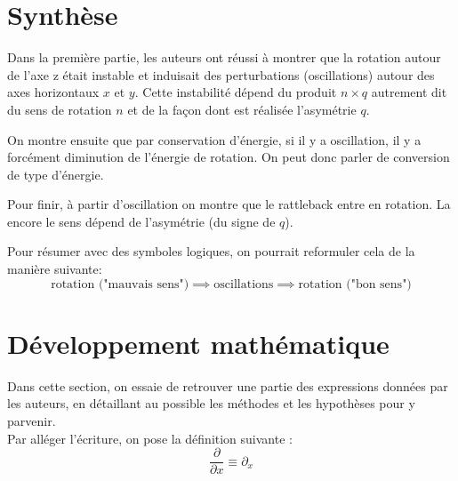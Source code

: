 \documentclass[12pt,a4paper]{article}
\begin{document}
	\section{Synthèse}
	Dans la première partie, les auteurs ont réussi à montrer que la rotation autour de l'axe z était instable et induisait des perturbations (oscillations) autour des axes horizontaux $x$ et $y$. Cette instabilité dépend du produit $n\times q$ autrement dit du sens de rotation $n$ et de la façon dont est réalisée l'asymétrie $q$.
	
	On montre ensuite que par conservation d'énergie, si il y a oscillation, il y a forcément diminution de l'énergie de rotation. On peut donc parler de conversion de type d'énergie.
	
	Pour finir, à partir d'oscillation on montre que le rattleback entre en rotation. La encore le sens dépend de l'asymétrie (du signe de $q$).
	
	Pour résumer avec des symboles logiques, on pourrait reformuler cela de la manière suivante:
	$$\text{rotation ("mauvais sens")}\implies\text{oscillations}\implies\text{rotation ("bon sens")}$$
	\section{Développement mathématique}
	\label{sec:calculs}
	Dans cette section, on essaie de retrouver une partie des expressions données par les auteurs, en détaillant au possible les méthodes et les hypothèses pour y parvenir.\\
	Par alléger l'écriture, on pose la définition suivante :
	$$\dfrac{\partial}{\partial x}\equiv\partial_x$$ 
\end{document}
